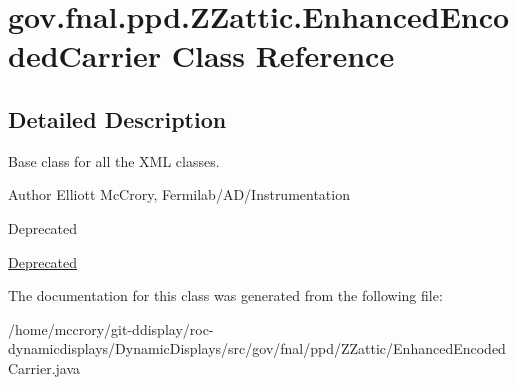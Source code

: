 \hypertarget{classgov_1_1fnal_1_1ppd_1_1ZZattic_1_1EnhancedEncodedCarrier}{\section{gov.\-fnal.\-ppd.\-Z\-Zattic.\-Enhanced\-Encoded\-Carrier Class Reference}
\label{classgov_1_1fnal_1_1ppd_1_1ZZattic_1_1EnhancedEncodedCarrier}
}


\subsection{Detailed Description}
Base class for all the X\-M\-L classes.

\begin{DoxyAuthor}{Author}
Elliott Mc\-Crory, Fermilab/\-A\-D/\-Instrumentation 
\end{DoxyAuthor}
\begin{DoxyRefDesc}{Deprecated}
\item[\hyperlink{deprecated__deprecated000015}{Deprecated}]\end{DoxyRefDesc}


The documentation for this class was generated from the following file\-:\begin{DoxyCompactItemize}
\item 
/home/mccrory/git-\/ddisplay/roc-\/dynamicdisplays/\-Dynamic\-Displays/src/gov/fnal/ppd/\-Z\-Zattic/Enhanced\-Encoded\-Carrier.\-java\end{DoxyCompactItemize}
